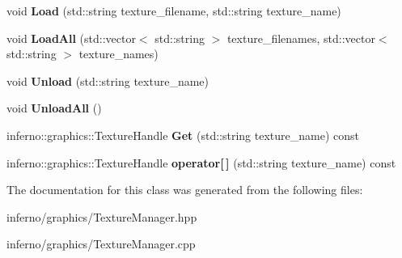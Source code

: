 \begin{DoxyCompactItemize}
\item 
\mbox{\label{classinferno_1_1graphics_1_1_texture_manager_aa8a3d242633cc83fd3fe178520d15cb6}} 
void {\bfseries Load} (std\+::string texture\+\_\+filename, std\+::string texture\+\_\+name)
\item 
\mbox{\label{classinferno_1_1graphics_1_1_texture_manager_ae1c0a268b96073bb0c925e3523f2bc58}} 
void {\bfseries Load\+All} (std\+::vector$<$ std\+::string $>$ texture\+\_\+filenames, std\+::vector$<$ std\+::string $>$ texture\+\_\+names)
\item 
\mbox{\label{classinferno_1_1graphics_1_1_texture_manager_af860bd092645a0c99afa35d3e978f3d8}} 
void {\bfseries Unload} (std\+::string texture\+\_\+name)
\item 
\mbox{\label{classinferno_1_1graphics_1_1_texture_manager_ab3f3fbf66a7c133ed129e1433b1c7cee}} 
void {\bfseries Unload\+All} ()
\item 
\mbox{\label{classinferno_1_1graphics_1_1_texture_manager_ae2b18c9725addce31e35034ea6642fbf}} 
inferno\+::graphics\+::\+Texture\+Handle {\bfseries Get} (std\+::string texture\+\_\+name) const
\item 
\mbox{\label{classinferno_1_1graphics_1_1_texture_manager_a419b62740d0cbff686820b9b4ccc95e2}} 
inferno\+::graphics\+::\+Texture\+Handle {\bfseries operator\mbox{[}$\,$\mbox{]}} (std\+::string texture\+\_\+name) const
\end{DoxyCompactItemize}


The documentation for this class was generated from the following files\+:\begin{DoxyCompactItemize}
\item 
inferno/graphics/Texture\+Manager.\+hpp\item 
inferno/graphics/Texture\+Manager.\+cpp\end{DoxyCompactItemize}
